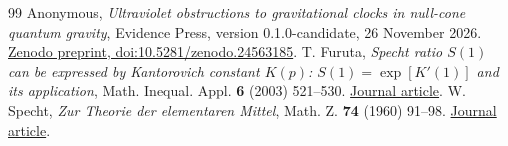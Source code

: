 \documentclass[11pt]{article}
\begin{document}
\begin{thebibliography}{99}
 Anonymous, \emph{Ultraviolet obstructions to gravitational clocks in null-cone quantum gravity}, Evidence Press, version 0.1.0-candidate, 26 November 2026. \href{https://zenodo.org/records/24563185}{Zenodo preprint, doi:10.5281/zenodo.24563185}.
 T. Furuta, \emph{Specht ratio $S(1)$ can be expressed by Kantorovich constant $K(p)$: $S(1)=\exp[K'(1)]$ and its application}, Math. Inequal. Appl. \textbf{6} (2003) 521--530. \href{https://files.ele-math.com/articles/mia-06-48.pdf}{Journal article}.
 W. Specht, \emph{Zur Theorie der elementaren Mittel}, Math. Z. \textbf{74} (1960) 91--98. \href{https://doi.org/10.1007/BF01180475}{Journal article}.
\end{thebibliography}
\end{document}
